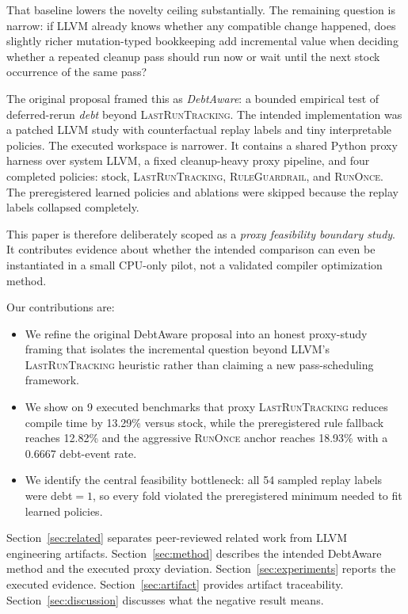 \documentclass{article}
\begin{document}
That baseline lowers the novelty ceiling substantially. The remaining question is narrow: if LLVM already knows whether any compatible change happened, does slightly richer mutation-typed bookkeeping add incremental value when deciding whether a repeated cleanup pass should run now or wait until the next stock occurrence of the same pass?

The original proposal framed this as \emph{DebtAware}: a bounded empirical test of deferred-rerun \emph{debt} beyond \textsc{LastRunTracking}. The intended implementation was a patched LLVM study with counterfactual replay labels and tiny interpretable policies. The executed workspace is narrower. It contains a shared Python proxy harness over system LLVM, a fixed cleanup-heavy proxy pipeline, and four completed policies: stock, \textsc{LastRunTracking}, \textsc{RuleGuardrail}, and \textsc{RunOnce}. The preregistered learned policies and ablations were skipped because the replay labels collapsed completely.

This paper is therefore deliberately scoped as a \emph{proxy feasibility boundary study}. It contributes evidence about whether the intended comparison can even be instantiated in a small CPU-only pilot, not a validated compiler optimization method.

Our contributions are:
\begin{itemize}
  \item We refine the original DebtAware proposal into an honest proxy-study framing that isolates the incremental question beyond LLVM's \textsc{LastRunTracking} heuristic rather than claiming a new pass-scheduling framework.
  \item We show on 9 executed benchmarks that proxy \textsc{LastRunTracking} reduces compile time by 13.29\% versus stock, while the preregistered rule fallback reaches 12.82\% and the aggressive \textsc{RunOnce} anchor reaches 18.93\% with a 0.6667 debt-event rate.
  \item We identify the central feasibility bottleneck: all 54 sampled replay labels were debt$=1$, so every fold violated the preregistered minimum needed to fit learned policies.
\end{itemize}

Section~\ref{sec:related} separates peer-reviewed related work from LLVM engineering artifacts. Section~\ref{sec:method} describes the intended DebtAware method and the executed proxy deviation. Section~\ref{sec:experiments} reports the executed evidence. Section~\ref{sec:artifact} provides artifact traceability. Section~\ref{sec:discussion} discusses what the negative result means.
\end{document}
